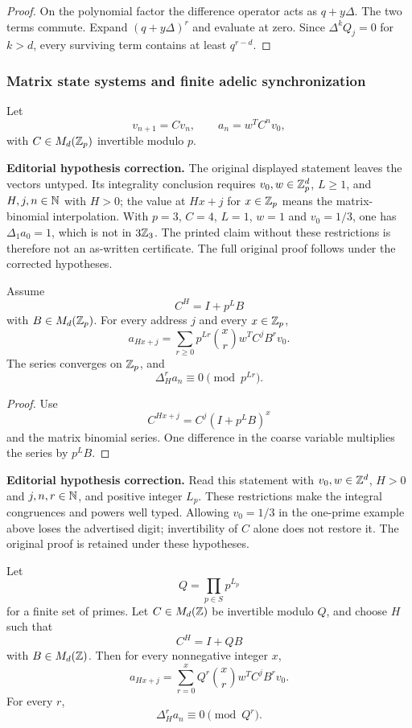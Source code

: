 \begin{proof}
On the polynomial factor the difference operator acts as \(q+y\Delta\). The two terms commute. Expand \((q+y\Delta)^r\) and evaluate at zero. Since \(\Delta^kQ_j=0\) for \(k>d\), every surviving term contains at least \(q^{r-d}\).
\end{proof}

\subsubsection{Matrix state systems and finite adelic synchronization}

Let
\[
v_{n+1}=Cv_n,
\qquad
a_n=w^TC^nv_0,
\]
with \(C\in M_d(\mathbb Z_p)\) invertible modulo \(p\).

\begin{histtheorem}\label{hist:thm:matrix_carmichael_mahler}
\par\noindent\textbf{Editorial hypothesis correction.} The original displayed statement leaves the vectors untyped. Its integrality conclusion requires $v_0,w\in\mathbb Z_p^d$, $L\ge1$, and $H,j,n\in\mathbb N$ with $H>0$; the value at $Hx+j$ for $x\in\mathbb Z_p$ means the matrix-binomial interpolation. With $p=3$, $C=4$, $L=1$, $w=1$ and $v_0=1/3$, one has $\Delta_1a_0=1$, which is not in $3\mathbb Z_3$. The printed claim without these restrictions is therefore not an as-written certificate. The full original proof follows under the corrected hypotheses.\par\medskip
Assume
\[
C^H=I+p^LB
\]
with \(B\in M_d(\mathbb Z_p)\). For every address \(j\) and every \(x\in\mathbb Z_p\),
\[
\boxed{
a_{Hx+j}
=
\sum_{r\geq0}
p^{Lr}\binom xr
w^TC^jB^rv_0.
}
\]
The series converges on \(\mathbb Z_p\), and
\[
\boxed{
\Delta_H^ra_n
\equiv0
\pmod {p^{Lr}}.
}
\]
\end{histtheorem}

\begin{proof}
Use
\[
C^{Hx+j}=C^j(I+p^LB)^x
\]
and the matrix binomial series. One difference in the coarse variable multiplies the series by \(p^LB\).
\end{proof}

\begin{histtheorem}\label{hist:thm:finite_adelic_transfer}
\par\noindent\textbf{Editorial hypothesis correction.} Read this statement with $v_0,w\in\mathbb Z^d$, $H>0$ and $j,n,r\in\mathbb N$, and positive integer $L_p$. These restrictions make the integral congruences and powers well typed. Allowing $v_0=1/3$ in the one-prime example above loses the advertised digit; invertibility of $C$ alone does not restore it. The original proof is retained under these hypotheses.\par\medskip
Let
\[
Q=\prod_{p\in S}p^{L_p}
\]
for a finite set of primes. Let \(C\in M_d(\mathbb Z)\) be invertible modulo \(Q\), and choose \(H\) such that
\[
C^H=I+QB
\]
with \(B\in M_d(\mathbb Z)\). Then for every nonnegative integer \(x\),
\[
\boxed{
a_{Hx+j}
=
\sum_{r=0}^{x}Q^r\binom xr
w^TC^jB^rv_0.
}
\]
For every \(r\),
\[
\boxed{
\Delta_H^ra_n\equiv0\pmod {Q^r}.
}
\]
\end{histtheorem}

